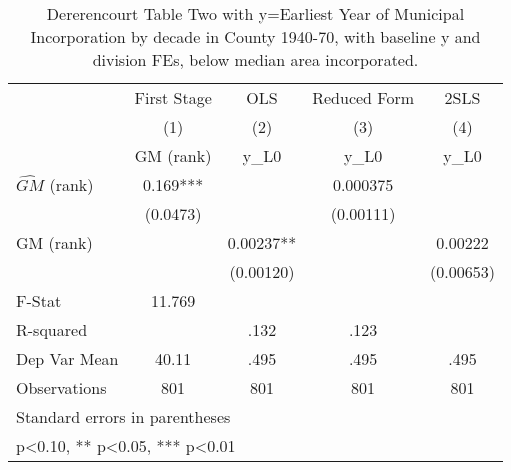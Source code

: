 \begin{table}[htbp]\centering
\def\sym#1{\ifmmode^{#1}\else\(^{#1}\)\fi}
\caption{Dererencourt Table Two with y=Earliest Year of Municipal Incorporation by decade in County 1940-70, with baseline y and division FEs, below median area incorporated.}
\begin{tabular}{l*{4}{c}}
\toprule
                    & First Stage   &         OLS   &Reduced Form   &        2SLS   \\
                    &\multicolumn{1}{c}{(1)}&\multicolumn{1}{c}{(2)}&\multicolumn{1}{c}{(3)}&\multicolumn{1}{c}{(4)}\\
                    &\multicolumn{1}{c}{GM  (rank)}&\multicolumn{1}{c}{y\_L0}&\multicolumn{1}{c}{y\_L0}&\multicolumn{1}{c}{y\_L0}\\
\midrule
$\hat{GM}$ (rank)   &       0.169***&               &    0.000375   &               \\
                    &    (0.0473)   &               &   (0.00111)   &               \\
\addlinespace
GM  (rank)          &               &     0.00237** &               &     0.00222   \\
                    &               &   (0.00120)   &               &   (0.00653)   \\
\midrule
F-Stat              &      11.769   &               &               &               \\
R-squared           &               &        .132   &        .123   &               \\
Dep Var Mean        &       40.11   &        .495   &        .495   &        .495   \\
Observations        &         801   &         801   &         801   &         801   \\
\bottomrule
\multicolumn{5}{l}{\footnotesize Standard errors in parentheses}\\
\multicolumn{5}{l}{\footnotesize * p<0.10, ** p<0.05, *** p<0.01}\\
\end{tabular}
\end{table}
